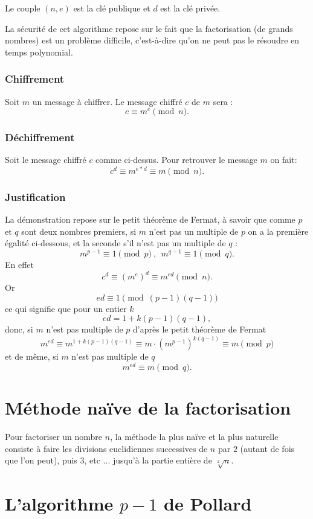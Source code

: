 \documentclass[french, 12pt, titlepage]{article}
\begin{document}
Le couple $(n, e)$ est la clé publique et $d$ est la clé privée.

La sécurité de cet algorithme repose sur le fait que la factorisation (de grands nombres) est un problème difficile, c'est-à-dire qu'on ne peut pas le résoudre en temps polynomial.

\subsubsection{Chiffrement}
Soit $m$ un message à chiffrer. Le message chiffré $c$ de $m$ sera :
\[ c \equiv m^e \pmod n .\]
\subsubsection{Déchiffrement}

Soit le message chiffré $c$ comme ci-dessus. Pour retrouver le message $m$ on fait:
\[ c^d \equiv m^{e*d} \equiv m \pmod n.\]

\subsubsection{Justification}

La démonstration repose sur le petit théorème de Fermat, à savoir que comme $p$ et $q$ sont deux nombres premiers, si $m$ n'est pas un multiple de $p$ on a la première égalité ci-dessous, et la seconde s'il n'est pas un multiple de $q$ :
\[ m^{p-1} \equiv 1 \pmod p\ ,\ \ m^{q-1} \equiv 1 \pmod q.\]
En effet
\[ c^d \equiv (m^e)^d \equiv m^{ed} \pmod n.\]
Or
\[ed \equiv 1 \pmod{(p-1)(q-1)}\]
ce qui signifie que pour un entier $k$
\[ed = 1 + k(p-1)(q-1),\]
donc, si $m$ n'est pas multiple de $p$ d'après le petit théorème de Fermat
\[m^{ed} \equiv m^{1+k(p-1)(q-1) }\equiv m\cdot \left(m^{p-1}\right)^{k(q-1)}\equiv m \pmod p\]
et de même, si $m$ n'est pas multiple de $q$
\[m^{ed}\equiv m \pmod q.\]

\section{Méthode naïve de la factorisation}

Pour factoriser un nombre $n$, la méthode la plus naïve et la plus naturelle consiste à faire les divisions euclidiennes successives de $n$ par $2$ (autant de fois que l'on peut), puis $3$, etc ... jusqu'à la partie entière de $\sqrt[2]{n}.$


\section{L'algorithme $p-1$ de Pollard}
\end{document}
